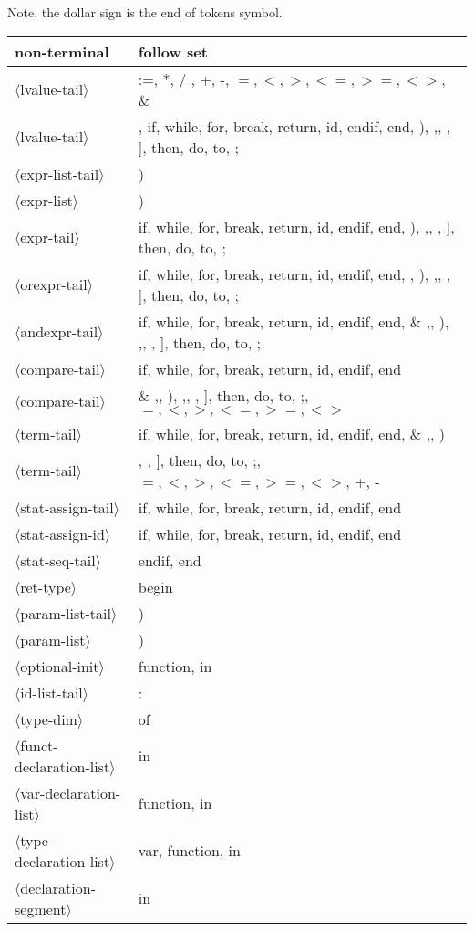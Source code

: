 \documentclass[11pt, fleqn]{article}
\newcommand{\atag}[1]{$\langle$#1$\rangle$}
\begin{document}
Note, the dollar sign is the end of tokens symbol.

\begin{longtable}{l|l}
non-terminal						&	follow set												\\
\hline
\atag{lvalue-tail}				&	:=, *, /	, +, -, $=, <, >, <=, >=, <>$, \& \\
\atag{lvalue-tail}				&	\textbar , if, while, for, break, return, id, endif, end, ), ,, , ], then, do, to, ; 					\\
\atag{expr-list-tail}			&	)												\\
\atag{expr-list}					&	)								\\
\atag{expr-tail}					&	if, while, for, break, return, id, endif, end, ), ,, , ], then, do, to, ;	\\
\atag{orexpr-tail}				&	if, while, for, break, return, id, endif, end, \textbar , ), ,, , ], then, do, to, ;	\\
\atag{andexpr-tail}				&	if, while, for, break, return, id, endif, end, \& ,\textbar , ), ,, , ], then, do, to, ; 	\\
\atag{compare-tail}				&	if, while, for, break, return, id, endif, end	\\
\atag{compare-tail}				&	\& ,\textbar , ), ,, , ], then, do, to, ;, $=, <, >, <=, >=, <>$	\\
\atag{term-tail}					&	if, while, for, break, return, id, endif, end, \& ,\textbar , )	\\
\atag{term-tail}					&	, , ], then, do, to, ;, $=, <, >, <=, >=, <>$, +, -	\\
\atag{stat-assign-tail}			&	if, while, for, break, return, id, endif, end	\\
\atag{stat-assign-id}			&	if, while, for, break, return, id, endif, end	\\
\atag{stat-seq-tail}				&	endif, end		\\
\atag{ret-type}					&	begin		\\
\atag{param-list-tail}			&	)	\\
\atag{param-list}				&	)		\\
\atag{optional-init}				&	function, in		\\
\atag{id-list-tail}				&	:		\\
\atag{type-dim}					&	of	\\
\atag{funct-declaration-list}	&	in	\\
\atag{var-declaration-list}		&	function, in	\\
\atag{type-declaration-list}		&	var, function, in		\\
\atag{declaration-segment}		&	in	\\
\end{longtable}
\end{document}
